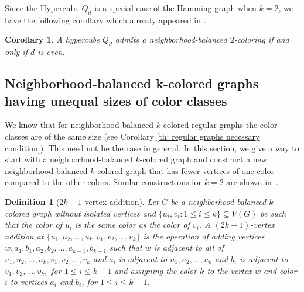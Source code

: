 \documentclass[12pt]{article}
\newtheorem{corollary}[theorem]{Corollary}
\newtheorem{definition}[theorem]{Definition}
\newcommand{\nbcd}{neighborhood-balanced $k$-colored\xspace}
\begin{document}
Since the Hypercube $Q_d$ is a special case of the Hamming graph when $k=2$, we have the following corollary which already appeared in \cite{collin-cnbc}.

\begin{corollary}
   A hypercube $Q_d$ admits a neighborhood-balanced $2$-coloring if and only if $d$ is even.
\end{corollary}


\subsection{\small Neighborhood-balanced \texorpdfstring{k}{$k$}-colored graphs having unequal sizes of color classes}\label{sec:unequalcolorclass}

We know that for \nbcd regular graphs the color classes are of the same size (see Corollary \ref{th: regular graphs necessary condition}).
This need not be the case in general.
In this section, we give a way to start with a \nbcd graph and construct a new \nbcd graph that has fewer vertices of one color compared to the other colors.
Similar constructions for $k=2$ are shown in~\cite{collin-cnbc}.

\begin{definition}[\(2k-1\)-vertex addition]\label{def:vertexaddition}
Let $G$ be a \nbcd graph without isolated vertices and $\{u_i, v_i : 1 \le i \le k\} \subseteq V(G)$ be such that the color of $u_i$ is the same color as the color of $v_i$.
A {\it $(2k-1)$-vertex addition} at $\{u_1,u_2, \dots,u_{k}, v_1, v_2, \dots, v_{k}\}$ is the operation of adding vertices $w, a_1, b_1, a_2, b_2, \dots, a_{k-1}, b_{k-1}$ such that $w$ is adjacent to all of $u_1, u_2, \dots, u_{k}, v_1, v_2,  \dots, v_{k}$ and $a_i$ is adjacent to $u_1,u_2,  \dots, u_{k}$ and $b_i$ is adjacent to $v_1, v_2, \dots, v_{k},$ for $1 \leq i \leq k-1$ and assigning the color $k$ to the vertex $w$ and color $i$  to vertices $a_i$ and $b_i$, for $1 \leq i \leq k-1$.
\end{definition}
\end{document}
